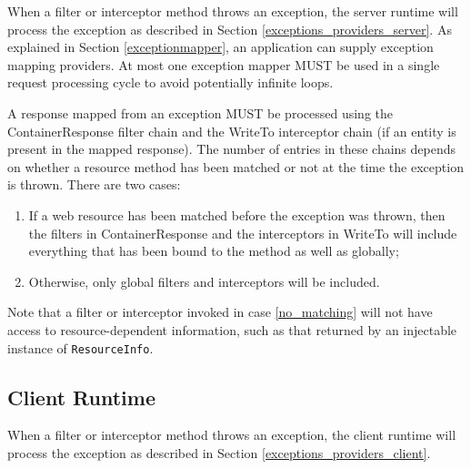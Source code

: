 When a filter or interceptor method throws an exception, the server runtime will process the exception as described in
Section \ref{exceptions_providers_server}. As explained in Section \ref{exceptionmapper}, an application can supply
exception mapping providers. At most one exception mapper MUST be used in a single request processing cycle to avoid
potentially infinite loops.

A response mapped from an exception MUST be processed using the ContainerResponse filter chain and the WriteTo
interceptor chain (if an entity is present in the mapped response). The number of entries in these chains depends on
whether a resource method has been matched or not at the time the exception is thrown. There are two cases:

\begin{enumerate}
    \item If a web resource has been matched before the exception was thrown, then the filters in ContainerResponse and
    the interceptors in WriteTo will include everything that has been bound to the method as well as globally;
    \item\label{no_matching} Otherwise, only global filters and interceptors will be included.
\end{enumerate}

Note that a filter or interceptor invoked in case \ref{no_matching} will not have access to resource-dependent
information, such as that returned by an injectable instance of \lstinline{ResourceInfo}.

\subsection{Client Runtime}

When a filter or interceptor method throws an exception, the client runtime will process the exception as described in
Section \ref{exceptions_providers_client}.
